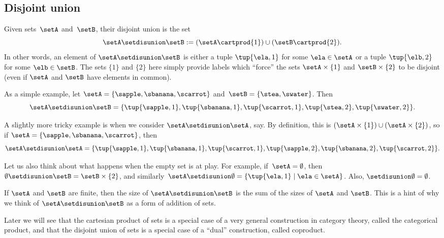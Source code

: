 \subsection{Disjoint union}
\label{sec:disjoint-union}

Given sets~$\setA$ and~$\setB$, their disjoint union is the set
\begin{equation*}
    \setA \setdisunion \setB := (\setA \cartprod \{ 1 \}) \cup (\setB \cartprod \{2\}).
\end{equation*}
In other words, an element of  $\setA \setdisunion \setB$ is either a tuple $\tup{\ela, 1}$ for some  $\ela \in \setA$ or a tuple $\tup{\elb, 2}$ for some $\elb \in \setB$. The sets $\{ 1 \}$ and $\{2\}$ here simply provide labels which ``force'' the sets $\setA \times \{ 1 \}$ and $\setB \times \{2\}$ to be disjoint (even if $\setA$ and $\setB$ have elements in common). 

As a simple example, let $\setA = \{ \sapple, \sbanana, \scarrot\}$ and~$\setB = \{ \stea, \swater \}$. Then
\begin{equation*}
    \setA \setdisunion \setB = \{ \tup{\sapple, 1}, \tup{\sbanana, 1}, \tup{\scarrot, 1}, \tup{\stea, 2},  \tup{\swater, 2}\}.
\end{equation*}

A slightly more tricky example is when we consider $\setA \setdisunion \setA$, say. By definition, this is $(\setA \times \{ 1 \}) \cup (\setA \times \{2\})$, so if $\setA = \{ \sapple, \sbanana, \scarrot\}$, then 
\begin{equation*}
\setA \setdisunion \setA = \{ \tup{\sapple, 1}, \tup{\sbanana, 1}, \tup{\scarrot, 1}, \tup{\sapple, 2}, \tup{\sbanana, 2}, \tup{\scarrot, 2} \}.
\end{equation*}


Let us also think about what happens when the empty set is at play. For example, if~$\setA = \emptyset$, then~$\emptyset \setdisunion \setB = \setB \times \{2\}$, and similarly~$\setA \setdisunion \emptyset =  \{ \tup{\ela,1} \mid \ela \in \setA \}$. Also, $\empty \setdisunion \emptyset = \emptyset$.  

\begin{remark}
If $\setA$ and $\setB$ are finite, then the size of $\setA \setdisunion \setB$ is the sum of the sizes of $\setA$ and $\setB$. This is a hint of why we think of $\setA \setdisunion \setB$ as a form of addition of sets. 
\end{remark}

Later we will see that the cartesian product of sets is a special case of a very general construction in category theory, called the categorical product, and that the disjoint union of sets is a special case of a ``dual'' construction, called coproduct.


